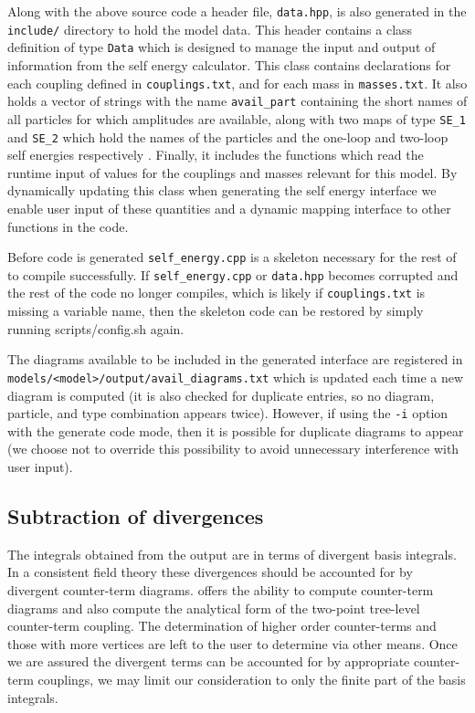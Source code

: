 Along with the above source code a header file, \lstinline{data.hpp}, is also generated in the \lstinline{include/} directory to hold the model data.  This header contains a class definition of type \lstinline{Data} which is designed to manage the input and output of information from the self energy calculator.   This class contains declarations for each coupling defined in \lstinline{couplings.txt}, and for each mass in \lstinline{masses.txt}.  It also holds a vector of strings with the name \lstinline{avail_part} containing the short names of all particles for which amplitudes are available, along with two maps of type  \lstinline{SE_1} and \lstinline{SE_2} which hold the names of the particles and the one-loop and two-loop self energies respectively .  Finally, it includes the functions which read the runtime input of values for the couplings and masses relevant for this model.  By dynamically updating this class when generating the self energy interface we enable user input of these quantities and a dynamic mapping interface to other functions in the code.

Before code is generated \lstinline{self_energy.cpp} is a skeleton necessary for the rest of \mb to compile successfully.  If \lstinline{self_energy.cpp} or \lstinline{data.hpp} becomes corrupted and the rest of the code no longer compiles, which is likely if \lstinline{couplings.txt} is missing a variable name, then the skeleton code can be restored by simply running scripts/config.sh again.

The diagrams available to be included in the generated \tsil interface are registered in \lstinline{models/<model>/output/avail_diagrams.txt} which is updated each time a new diagram is computed (it is also checked for duplicate entries, so no diagram, particle, and type combination appears twice).  However, if using the \lstinline{-i} option with the generate code mode, then it is possible for duplicate diagrams to appear (we choose not to override this possibility to avoid unnecessary interference with user input).

\subsection{Subtraction of divergences}

The integrals obtained from the \tarcer output are in terms of divergent basis integrals.  In a consistent field theory these divergences should be accounted for by divergent counter-term diagrams.  \mb offers the ability to compute counter-term diagrams and also compute the analytical form of the two-point tree-level counter-term coupling.  The determination of higher order counter-terms and those with more vertices are left to the user to determine via other means.  Once we are assured the divergent terms can be accounted for by appropriate counter-term couplings, we may limit our consideration to only the finite part of the basis integrals.

